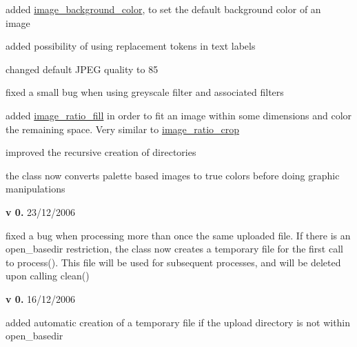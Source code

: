 \begin{DoxyItemize}
\begin{DoxyItemize}
\item added \hyperlink{}{image\+\_\+background\+\_\+color}, to set the default background color of an image~\newline

\item added possibility of using replacement tokens in text labels~\newline

\item changed default J\+P\+E\+G quality to 85~\newline

\item fixed a small bug when using greyscale filter and associated filters~\newline

\item added \hyperlink{}{image\+\_\+ratio\+\_\+fill} in order to fit an image within some dimensions and color the remaining space. Very similar to \hyperlink{}{image\+\_\+ratio\+\_\+crop}~\newline

\item improved the recursive creation of directories~\newline

\item the class now converts palette based images to true colors before doing graphic manipulations 
\end{DoxyItemize}
\item {\bfseries v 0.} 23/12/2006~\newline

\begin{DoxyItemize}
\item fixed a bug when processing more than once the same uploaded file. If there is an open\+\_\+basedir restriction, the class now creates a temporary file for the first call to process(). This file will be used for subsequent processes, and will be deleted upon calling clean() 
\end{DoxyItemize}
\item {\bfseries v 0.} 16/12/2006~\newline

\begin{DoxyItemize}
\item added automatic creation of a temporary file if the upload directory is not within open\+\_\+basedir~\newline


\end{DoxyItemize}
\end{DoxyItemize}
